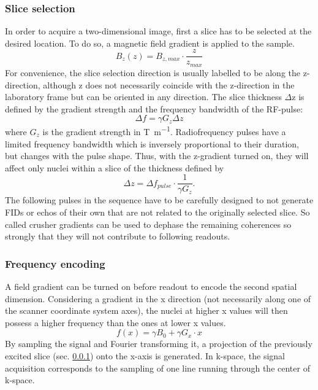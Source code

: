         \subsubsection{Slice selection}
        \label{sec:theory:sliceSelection}
        In order to acquire a two-dimensional image, first a slice has to be selected at the desired location. To do so, a magnetic field gradient is applied to the sample. 
            \begin{equation}
                B_z(z) = B_{z,max} \cdot \frac{z}{z_{max}}
            \end{equation}
            For convenience, the slice selection direction is usually labelled to be along the z-direction, although z does not necessarily coincide with the z-direction in the laboratory frame but can be oriented in any direction.
            The slice thickness $\Delta$z is defined by the gradient strength and the frequency bandwidth of the RF-pulse:
            \begin{equation}
                \Delta f = \gamma G_z \Delta z
            \end{equation}
            where $G_z$ is the gradient strength in \si{\tesla\per\meter}.
            Radiofrequency pulses have a limited frequency bandwidth which is inversely proportional to their duration, but changes with the pulse shape. Thus, with the z-gradient turned on, they will affect only nuclei within a slice of the thickness defined by
            \begin{equation}
                \Delta z = \Delta f_{pulse} \cdot \frac{1}{\gamma G_z}.
            \end{equation}
             The following pulses in the sequence have to be carefully designed to not generate FIDs or echos of their own that are not related to the originally selected slice. So called crusher gradients can be used to dephase the remaining coherences so strongly that they will not contribute to following readouts.
        \subsubsection{Frequency encoding}
        A field gradient can be turned on before readout to encode the second spatial dimension. Considering a gradient in the x direction (not necessarily along one of the scanner coordinate system axes), the nuclei at higher x values will then possess a higher frequency than the ones at lower x values.
            \begin{equation}
                f(x) = \gamma B_0 + \gamma G_x \cdot x
            \end{equation}
              By sampling the signal and Fourier transforming it, a projection of the previously excited slice (sec. \ref{sec:theory:sliceSelection}) onto the x-axis is generated. In k-space, the signal acquisition corresponds to the sampling of one line running through the center of k-space.
